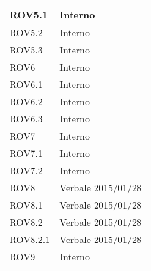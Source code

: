 \begin{center}
\begin{longtable}{| p{4cm} | p{4cm} |}
\hline
ROV5.1   &  Interno \\
\hline
ROV5.2   &  Interno \\
\hline
ROV5.3   &  Interno \\
\hline
ROV6   &  Interno \\
\hline
ROV6.1   &  Interno \\
\hline
ROV6.2   &  Interno \\
\hline
ROV6.3   &  Interno \\
\hline
ROV7   &  Interno \\
\hline
ROV7.1   &  Interno \\
\hline
ROV7.2   &  Interno \\
\hline
ROV8   &  Verbale 2015/01/28 \\
\hline
ROV8.1   &  Verbale 2015/01/28 \\
\hline
ROV8.2   &  Verbale 2015/01/28 \\
\hline
ROV8.2.1   &  Verbale 2015/01/28 \\
\hline
ROV9   &  Interno \\
\hline
\end{longtable}
\egroup
\end{center}

